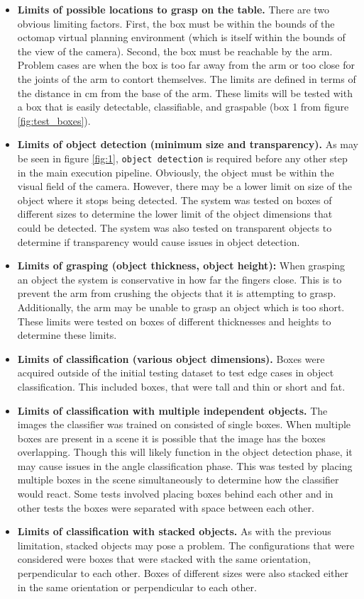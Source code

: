 \documentclass[letterpaper, 10 pt, conference]{conf/ieeeconf}  %
\begin{document}
\begin{itemize}
\item \textbf{Limits of possible locations to grasp on the table.}
  There are two obvious limiting factors. First, the box must be within the
  bounds of the octomap virtual planning environment (which is itself within the
  bounds of the view of the camera). Second, the box must be reachable by the arm.
  Problem cases are when the box is too far away from the arm or too close for the
  joints of the arm to contort themselves. The limits are defined in terms of the
  distance in \si{\centi\meter} from the base of the arm. These limits will be
  tested with a box that is easily detectable, classifiable, and graspable (box 1
  from figure \ref{fig:test_boxes}).
\item \textbf{Limits of object detection (minimum size and transparency).}
  As may be seen in figure \ref{fig:1}, \texttt{object detection} is required
  before any other step in the main execution pipeline. Obviously, the object must
  be within the visual field of the camera. However, there may be a lower limit on
  size of the object where it stops being detected. The system was tested on boxes
  of different sizes to determine the lower limit of the object dimensions that
  could be detected. The system was also tested on transparent objects to
  determine if transparency would cause issues in object detection.
\item \textbf{Limits of grasping (object thickness, object height):}
  When grasping an object the system is conservative in how far the fingers
  close. This is to prevent the arm from crushing the objects that it is
  attempting to grasp. Additionally, the arm may be unable to grasp an object
  which is too short. These limits were tested on boxes of different thicknesses
  and heights to determine these limits.
\item \textbf{Limits of classification (various object dimensions).}
  Boxes were acquired outside of the initial testing dataset to test edge cases
  in object classification. This included boxes, that were tall and
  thin or short and fat.
\item \textbf{Limits of classification with multiple independent objects.}
  The images the classifier was trained on consisted of single boxes. When
  multiple boxes are present in a scene it is possible that the image has the
  boxes overlapping. Though this will likely function in the object detection
  phase, it may cause issues in the angle classification phase. This was tested by
  placing multiple boxes in the scene simultaneously to determine how the
  classifier would react. Some tests involved placing boxes behind each other and
  in other tests the boxes were separated with space between each other.
\item \textbf{Limits of classification with stacked objects.}
  As with the previous limitation, stacked objects may pose a problem. The
  configurations that were considered were boxes that were stacked with the same
  orientation, perpendicular to each other. Boxes of different sizes were also
  stacked either in the same orientation or perpendicular to each other.
\end{itemize}
\end{document}

